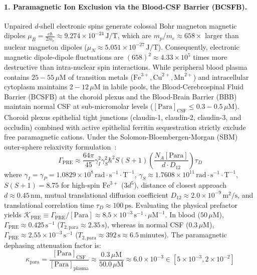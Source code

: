 \documentclass[10pt,twocolumn,3p]{article}
\begin{document}
\paragraph{1. Paramagnetic Ion Exclusion via the Blood-CSF Barrier (BCSFB).}
Unpaired $d$-shell electronic spins generate colossal Bohr magneton magnetic dipoles $\mu_B = \frac{e\hbar}{2m_e} \approx 9.274 \times 10^{-24}\,\text{J/T}$, which are $m_p/m_e \approx 658\times$ larger than nuclear magneton dipoles ($\mu_N \approx 5.051 \times 10^{-27}\,\text{J/T}$). Consequently, electronic magnetic dipole-dipole fluctuations are $(658)^2 \approx 4.33 \times 10^5$ times more destructive than intra-nuclear spin interactions. While peripheral blood plasma contains $25 - 55\,\mu\text{M}$ of transition metals ($\text{Fe}^{3+}, \text{Cu}^{2+}, \text{Mn}^{2+}$) and intracellular cytoplasm maintains $2 - 12\,\mu\text{M}$ in labile pools, the Blood-Cerebrospinal Fluid Barrier (BCSFB) at the choroid plexus and the Blood-Brain Barrier (BBB) maintain normal CSF at sub-micromolar levels ($[\text{Para}]_{\text{CSF}} \le 0.3 - 0.5\,\mu\text{M}$). Choroid plexus epithelial tight junctions (claudin-1, claudin-2, claudin-3, and occludin) combined with active epithelial ferritin sequestration strictly exclude free paramagnetic cations. Under the Solomon-Bloembergen-Morgan (SBM) outer-sphere relaxivity formulation~\cite{solomon1955}:
\begin{equation}
    \Gamma_{\text{PRE}} \approx \frac{64 \pi}{45} \gamma_I^2 \gamma_S^2 \hbar^2 S(S+1) \left( \frac{N_A [\text{Para}]}{d \cdot D_{12}} \right) \tau_D
    \label{eq:sbm_outer_sphere}
\end{equation}
where $\gamma_I = \gamma_P = 1.0829 \times 10^8\,\text{rad}\cdot\text{s}^{-1}\cdot\text{T}^{-1}$, $\gamma_S \approx 1.7608 \times 10^{11}\,\text{rad}\cdot\text{s}^{-1}\cdot\text{T}^{-1}$, $S(S+1) = 8.75$ for high-spin $\text{Fe}^{3+}$ ($3d^5$), distance of closest approach $d \approx 0.45\,\text{nm}$, mutual translational diffusion coefficient $D_{12} \approx 2.0 \times 10^{-9}\,\text{m}^2/\text{s}$, and translational correlation time $\tau_D \approx 100\,\text{ps}$. Evaluating the physical prefactor yields $\mathcal{K}_{\text{PRE}} \equiv \Gamma_{\text{PRE}} / [\text{Para}] \approx 8.5 \times 10^{-3}\,\text{s}^{-1}\cdot\mu\text{M}^{-1}$. In blood ($50\,\mu\text{M}$), $\Gamma_{\text{PRE}} \approx 0.425\,\text{s}^{-1}$ ($T_{2,\text{para}} \approx 2.35\,\text{s}$), whereas in normal CSF ($0.3\,\mu\text{M}$), $\Gamma_{\text{PRE}} \approx 2.55 \times 10^{-3}\,\text{s}^{-1}$ ($T_{2,\text{para}} \approx 392\,\text{s} \approx 6.5\,\text{minutes}$). The paramagnetic dephasing attenuation factor is:
\begin{equation}
    \kappa_{\text{para}} = \frac{[\text{Para}]_{\text{CSF}}}{[\text{Para}]_{\text{plasma}}} \approx \frac{0.3\,\mu\text{M}}{50.0\,\mu\text{M}} \approx 6.0 \times 10^{-3} \in [5 \times 10^{-3}, 2 \times 10^{-2}]
\end{equation}
\end{document}
